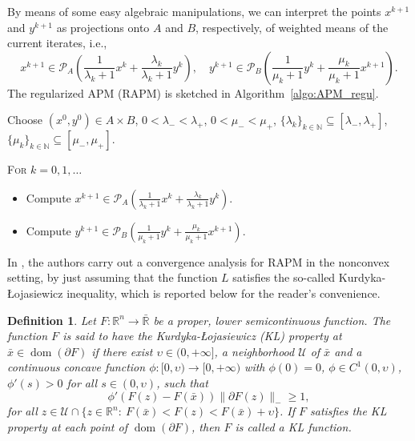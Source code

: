 \documentclass[pdflatex,sn-mathphys-num]{sn-jnl}
\numberwithin{equation}{section}%
\def\R{\mathbb{R}}
\def\bR{\bar{\mathbb{R}}}
\def\dom{\operatorname{dom}}
\newcommand{\proj}{\mathcal{P}}
\theoremstyle{thmstyleone}%
\theoremstyle{thmstyletwo}%
\theoremstyle{thmstylethree}%
\newtheorem{definition}{Definition}[section]%
\begin{document}
By means of some easy algebraic manipulations, we can interpret the points $x^{k+1}$ and $y^{k+1}$ as projections onto $A$ and $B$, respectively, of weighted means of the current iterates, i.e.,
\begin{equation*}
     x^{k+1}\in\proj_A\left(\frac{1}{\lambda_k+1}x^k+\frac{\lambda_k}{\lambda_k+1}y^k\right), \quad y^{k+1}\in \proj_B\left(\frac{1}{\mu_k+1}y^k+\frac{\mu_k}{\mu_k+1}x^{k+1}\right).
\end{equation*}
The regularized APM (RAPM)  is sketched  in Algorithm~\ref{algo:APM_regu}.

\begin{algorithm}[h!]\caption{Regularized Alternating Projection Method (RAPM)\cite {attouch2010proximal,attouch2007}}\label{algo:APM_regu}
    Choose $(x^0,y^0)\in A\times B$, 
    $0<\lambda_{-}<\lambda_+$, $0<\mu_{-}<\mu_+$, $\{\lambda_k\}_{k\in\mathbb{N}}\subseteq [\lambda_{-},\lambda_+]$, $\{\mu_k\}_{k\in\mathbb{N}}\subseteq [\mu_{-},\mu_{+}]$.
    
    {\textsc{For} $k=0,1,\ldots$}
    \begin{itemize}[leftmargin=2cm]
        \item[{\sc Step 1}] Compute $x^{k+1} \in \proj_A\left(\frac{1}{\lambda_k+1}x^k+\frac{\lambda_k}{\lambda_k+1}y^k\right)$.
        \item[{\sc Step 2}] Compute $y^{k+1} \in \proj_B\left(\frac{1}{\mu_k+1}y^k+\frac{\mu_k}{\mu_k+1}x^{k+1}\right)$.
    \end{itemize}
\end{algorithm}
In \cite{attouch2010proximal}, the authors carry out a convergence analysis for RAPM in the nonconvex setting, by just assuming that the function $L$ satisfies the so-called Kurdyka-\L{}ojasiewicz inequality, which is reported below for the reader's convenience.

\begin{definition}\label{def:KL_original}
    Let $F:\R^n \longrightarrow \bR$  be a proper, lower semicontinuous function. The function $F$ is said to have the Kurdyka-\L{}ojasiewicz (KL) property at $\bar{x} \in \dom(\partial F)$ if there exist $\upsilon \in (0,+\infty]$, a neighborhood $\mathcal{U}$ of  $\bar{x}$ and a continuous concave function $\phi:[0,\upsilon)\longrightarrow [0,+\infty)$ with $\phi(0) = 0$, $\phi\in C^1(0,\upsilon)$, $\phi'(s) > 0$ for all $s \in (0,\upsilon)$, such that 
    \begin{equation*}
        \phi'(F(z)-F(\bar{x})) \|\partial F(z)\|_{-} \geq 1,
    \end{equation*}
    for all $z\in \mathcal{U}\cap \{z\in\R^n: \ F(\bar{x})<F(z)<F(\bar{x})+ \upsilon \}$. If $F$ satisfies the KL property at each point of $\operatorname{dom}(\partial F)$, then $F$ is called a KL function.
\end{definition}
\end{document}
